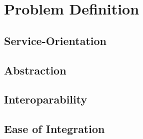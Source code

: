 \chapter{Problem Definition}

\section{Service-Orientation}

\section{Abstraction}

\section{Interoparability}

\section{Ease of Integration}